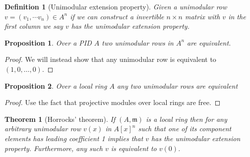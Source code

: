 \documentclass[12pt]{article}
\numberwithin{equation}{section}
\newtheorem{theorem}{Theorem}[section]
\newtheorem{definition}{Definition}[section]
\newtheorem{proposition}{Proposition}[section]
\begin{document}
	\begin{definition}[Unimodular extension property]
		Given a unimodular row $v=(v_1,\cdots v_n) \in A^n$ if we can construct a invertible $n \times n $  matrix with $v$ in the first column we say $v$ has the unimodular extension property.
	\end{definition}
	
	\begin{proposition}
		Over a PID $A$ two unimodular rows in $A^n$ are equivalent.
	\end{proposition}
	\begin{proof}
		We will instead show that any unimodular row is equivalent to $(1,0,\dots, 0)$.
	\end{proof}
	\begin{proposition}
		Over a local ring $A$ any two unimodular rows are equivalent
	\end{proposition}
	\begin{proof}
		Use the fact that projective modules over local rings are free.
	\end{proof}
	\begin{theorem}[Horrocks' theorem]
	If $(A, \mathfrak{m})$ is a local ring then for any arbitrary unimodular row $v(x)$ in $A[x]^n$ such that one of its component elements has leading coefficient 1 implies that $v$ has the unimodular extension property. Furthermore, any such $v$ is equivalent to $v(0)$.
	\end{theorem}
\end{document}
